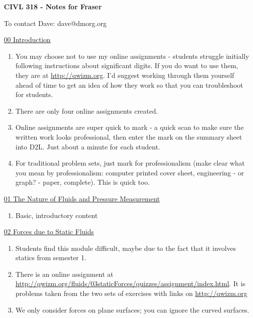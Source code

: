 \documentclass[9pt,oneside]{amsart}
\begin{document}
\Huge
\thispagestyle{empty}

\begin{center}
 \textbf{CIVL 318 - Notes for Fraser}
\end{center}
\normalsize
\parb
\vspace{1cm}

To  contact Dave: dave@dmorg.org
\parb

\underline{00 Introduction}
\begin{enumerate}
	\item You may choose not to use my online assignments - students struggle initially following instructions about significant digits. If you do want to use them, they are at \url{http://qwizm.org}. I'd suggest working through them yourself ahead of time to get an idea of how they work so that you can troubleshoot for students.
	\item There are only four online assignments created.
	\item Online assignments are super quick to mark - a quick scan to make sure the written work looks professional, then enter the mark on the summary sheet into D2L. Just about a minute for each student.
	\item For traditional problem sets, just mark for professionalism (make clear what you mean by professionalism: computer printed cover sheet, engineering - or graph? - paper, complete). This is quick too.
\end{enumerate}
\parb

\underline{01 The Nature of Fluids and Pressure Measurement}
\begin{enumerate}
	\item Basic, introductory content
\end{enumerate}
\parb

\underline{02 Forces due to Static Fluids}
\begin{enumerate}
	\item Students find this module difficult, maybe due to the fact that it involves statics from semester 1.
	\item There is an online assignment at \url{http://qwizm.org/fluids/03staticForces/quizzes/assignment/index.html}. It is problems taken from the two sets of exercises with links on \url{http://qwizm.org}
	\item We only consider forces on plane surfaces; you can ignore the curved surfaces.
\end{enumerate}
\end{document}
